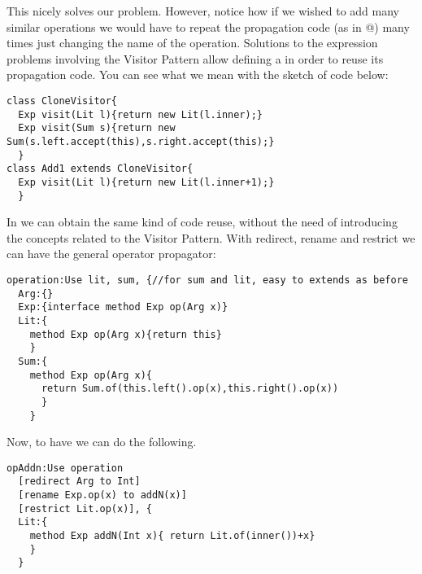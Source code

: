 This nicely solves our problem. 
However, notice how if we wished to add many similar operations we would 
have to repeat the propagation code (as in @) many times
just changing the name of the operation.
Solutions to the expression problems involving the  Visitor Pattern 
allow defining a \Q@CloneVisitor@ in order
to reuse its propagation code.
You can see what we mean with the sketch of code below:
\begin{lstlisting}
class CloneVisitor{
  Exp visit(Lit l){return new Lit(l.inner);}
  Exp visit(Sum s){return new Sum(s.left.accept(this),s.right.accept(this);}
  }
class Add1 extends CloneVisitor{
  Exp visit(Lit l){return new Lit(l.inner+1);}
  }
\end{lstlisting}
In \name we can obtain the same kind of code reuse, without the need of introducing 
the concepts related to the Visitor Pattern.
With redirect, rename and restrict we can have the general operator propagator:
\begin{lstlisting}
operation:Use lit, sum, {//for sum and lit, easy to extends as before
  Arg:{}
  Exp:{interface method Exp op(Arg x)}
  Lit:{
    method Exp op(Arg x){return this}
    }
  Sum:{
    method Exp op(Arg x){
      return Sum.of(this.left().op(x),this.right().op(x))
      }
    }
\end{lstlisting}

Now, to have \Q@addN@ we can do the following.

\begin{lstlisting}
opAddn:Use operation
  [redirect Arg to Int]
  [rename Exp.op(x) to addN(x)]
  [restrict Lit.op(x)], {
  Lit:{
    method Exp addN(Int x){ return Lit.of(inner())+x}
    }
  }
\end{lstlisting}  




